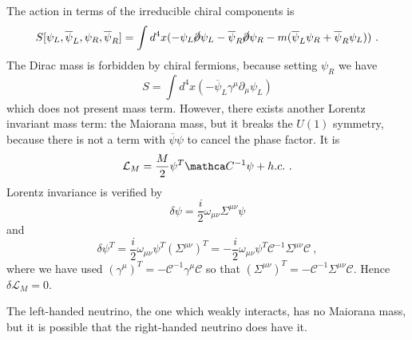     The action in terms of the irreducible chiral components is 
    \begin{equation*}
        S[\psi_L, \overline \psi_L, \psi_R, \overline \psi_R] = \int d^4 x (- \psi_L \cancel{\partial} \psi_L - \overline \psi_R \cancel{\partial} \psi_R - m (\overline \psi_L \psi_R + \overline \psi_R \psi_L)) ~.
    \end{equation*}
    The Dirac mass is forbidden by chiral fermions, because setting $\psi_R$ we have 
    \begin{equation*}
        S = \int d^4 x (- \overline \psi_L \gamma^\mu \partial_\mu \psi_L)
    \end{equation*}
    which does not present mass term. However, there exists another Lorentz invariant mass term: the Maiorana mass, but it breaks the $U(1)$ symmetry, because there is not a term with $\overline \psi \psi$ to cancel the phase factor. It is 
    \begin{equation*}
        \mathcal L_M = \frac{M}{2} \psi^T \mathca C^{-1} \psi + h.c. ~.
    \end{equation*}
    Lorentz invariance is verified by 
    \begin{equation*}
        \delta \psi = \frac{i}{2} \omega_{\mu\nu} \Sigma^{\mu\nu} \psi
    \end{equation*}
    and 
    \begin{equation*}
        \delta \psi^T = \frac{i}{2} \omega_{\mu\nu} \psi^T (\Sigma^{\mu\nu})^T = - \frac{i}{2} \omega_{\mu\nu} \psi^T \mathcal C^{-1} \Sigma^{\mu\nu} \mathcal C ~,
    \end{equation*}
    where we have used $(\gamma^\mu)^T = - \mathcal C^{-1} \gamma^\mu \mathcal C$ so that $(\Sigma^{\mu\nu})^T = - \mathcal C^{-1} \Sigma^{\mu\nu} \mathcal C$. Hence $\delta \mathcal L_M = 0$.





    The left-handed neutrino, the one which weakly interacts, has no Maiorana mass, but it is possible that the right-handed neutrino does have it.